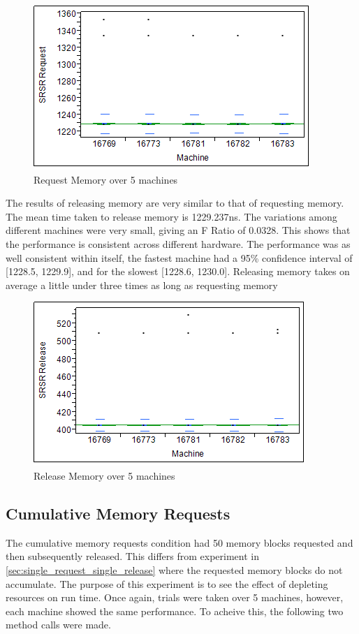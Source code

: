 \documentclass[12pt]{report}
\begin{document}
\begin{figure}[h!]
  \centering
    \includegraphics{SRSRRequestMemory.png}
  \caption{Request Memory over 5 machines}
\end{figure}

The results of releasing memory are very similar to that of requesting memory. The mean time taken to release memory is 1229.237ns. The variations among different machines were very small, giving an F Ratio of 0.0328. This shows that the performance is consistent across different hardware. The performance was as well consistent within itself, the fastest machine had a 95\% confidence interval of [1228.5, 1229.9], and for the slowest [1228.6, 1230.0]. Releasing memory takes on average a little under three times as long as requesting memory

\begin{figure}[h!]
  \centering
    \includegraphics{SRSRReleaseMemory.png}
  \caption{Release Memory over 5 machines}
\end{figure}

\subsection{Cumulative Memory Requests}
\label{sec:cumulative_memory_requests}

\par The cumulative memory requests condition had 50 memory blocks requested and then subsequently released. This differs from experiment in \ref{sec:single_request_single_release} where the requested memory blocks do not accumulate. The purpose of this experiment is to see the effect of depleting resources on run time. Once again, trials were taken over 5 machines, however, each machine showed the same performance. To acheive this, the following two method calls were made.
\end{document}
